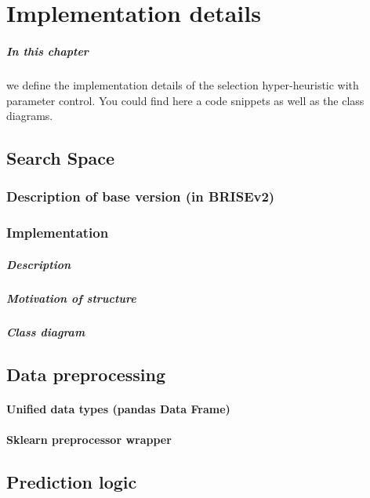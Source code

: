 \chapter{Implementation details}
\paragraph{In this chapter} we define the implementation details of the selection hyper-heuristic with parameter control. You could find here a code snippets as well as the class diagrams.


\section{Search Space}

\subsection{Description of base version (in BRISEv2)}

\subsection{Implementation}
\paragraph{Description}
\paragraph{Motivation of structure}
\paragraph{Class diagram}


\section{Data preprocessing}
\subsubsection{Unified data types (pandas Data Frame)}
\subsubsection{Sklearn preprocessor wrapper}


\section{Prediction logic}

